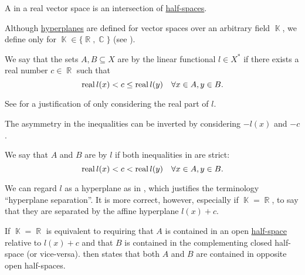 \begin{definition}\label{def:polyhedron}
  A  in a real vector space is an intersection of \hyperref[def:half_space]{half-spaces}.
\end{definition}

\begin{definition}\label{def:hyperplane_separation}
  Although \hyperref[def:hyperplane]{hyperplanes} are defined for vector spaces over an arbitrary field \( \BbbK \), we define  only for \( \BbbK \in \{ \BbbR, \BbbC \} \) (see ).

  We say that the sets \( A, B \subseteq X \) are  by the linear functional \( l \in X^* \) if there exists a real number \( c \in \BbbR \) such that
  \begin{equation}\label{def:hyperplane_separation/normal}
    \operatorname{real} l(x) < c \leq \operatorname{real} l(y) \quad\forall x \in A, y \in B.
  \end{equation}

  See  for a justification of only considering the real part of \( l \).

  The asymmetry in the inequalities  can be inverted by considering \( -l(x) \) and \( -c \).

  We say that \( A \) and \( B \) are  by \( l \) if both inequalities in  are strict:
  \begin{equation}\label{def:hyperplane_separation/strong}
    \operatorname{real} l(x) < c < \operatorname{real} l(y) \quad\forall x \in A, y \in B.
  \end{equation}

  We can regard \( l \) as a hyperplane as in , which justifies the terminology \enquote{hyperplane separation}. It is more correct, however, especially if \( \BbbK = \BbbR \), to say that they are separated by the affine hyperplane \( l(x) + c \).

  If \( \BbbK = \BbbR \)  is equivalent to requiring that \( A \) is contained in an open \hyperref[def:half_space]{half-space} relative to \( l(x) + c \) and that \( B \) is contained in the complementing closed half-space (or vice-versa).  then states that both \( A \) and \( B \) are contained in opposite open half-spaces.
\end{definition}

